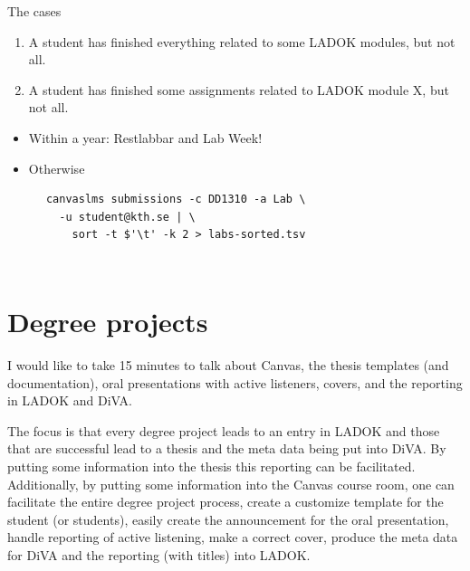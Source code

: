 \begin{frame}[fragile]
  \begin{block}{The cases}
    \begin{enumerate}
      \item A student has finished everything related to some LADOK modules, 
        but not all.
      \item A student has finished some assignments related to LADOK module X, 
        but not all.
    \end{enumerate}
  \end{block}

  \begin{solution}[Case 2]
    \begin{itemize}
      \item Within a year: Restlabbar and Lab Week!
      \item Otherwise
    \end{itemize}
    \begin{verbatim}
      canvaslms submissions -c DD1310 -a Lab \
        -u student@kth.se | \
          sort -t $'\t' -k 2 > labs-sorted.tsv
    \end{verbatim}
  \end{solution}
\end{frame}

\begin{frame}
  \inputminted{text}{labs.tsv}
\end{frame}

\begin{frame}
  \inputminted{text}{labs-sorted.tsv}
\end{frame}


\section{Degree projects}

I would like to take 15 minutes to talk about Canvas, the thesis templates      
(and documentation), oral presentations with active listeners, covers, and      
the reporting in LADOK and DiVA.                                                
                                                                                
The focus is that every degree project leads to an entry in LADOK and those     
that are successful lead to a thesis and the meta data being put into DiVA.     
By putting some information into the thesis this reporting can be               
facilitated. Additionally, by putting some information into the Canvas          
course room, one can facilitate the entire degree project process, create a     
customize template for the student (or students), easily create the             
announcement for the oral presentation, handle reporting of active              
listening, make a correct cover, produce the meta data for DiVA and the         
reporting (with titles) into LADOK.

